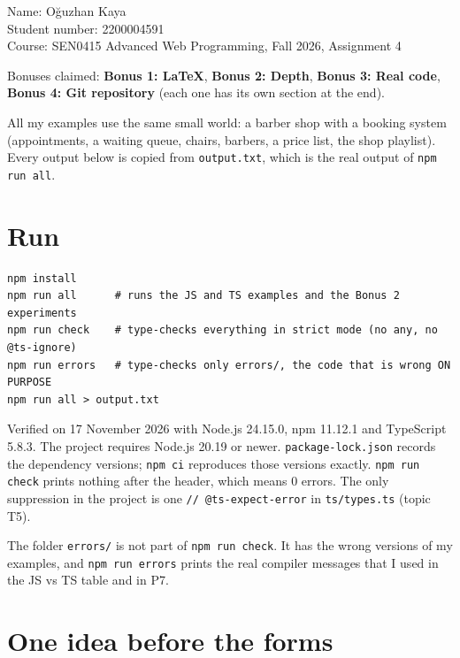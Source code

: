Name: Oğuzhan Kaya\\
Student number: 2200004591\\
Course: SEN0415 Advanced Web Programming, Fall 2026, Assignment 4

Bonuses claimed: \textbf{Bonus 1: LaTeX}, \textbf{Bonus 2: Depth}, \textbf{Bonus 3: Real code}, \textbf{Bonus 4: Git repository}
(each one has its own section at the end).

All my examples use the same small world: a barber shop with a booking system
(appointments, a waiting queue, chairs, barbers, a price list, the shop playlist).
Every output below is copied from \passthrough{\lstinline!output.txt!}, which is the real output of \passthrough{\lstinline!npm run all!}.

\section{Run}\label{run}

\begin{lstlisting}
npm install
npm run all      # runs the JS and TS examples and the Bonus 2 experiments
npm run check    # type-checks everything in strict mode (no any, no @ts-ignore)
npm run errors   # type-checks only errors/, the code that is wrong ON PURPOSE
npm run all > output.txt
\end{lstlisting}

Verified on 17 November 2026 with Node.js 24.15.0, npm 11.12.1 and TypeScript 5.8.3.
The project requires Node.js 20.19 or newer. \passthrough{\lstinline!package-lock.json!} records the dependency versions;
\passthrough{\lstinline!npm ci!} reproduces those versions exactly. \passthrough{\lstinline!npm run check!} prints nothing after the header, which means 0 errors.
The only suppression in the project is one \passthrough{\lstinline!// @ts-expect-error!} in \passthrough{\lstinline!ts/types.ts!} (topic T5).

The folder \passthrough{\lstinline!errors/!} is not part of \passthrough{\lstinline!npm run check!}. It has the wrong versions of my examples,
and \passthrough{\lstinline!npm run errors!} prints the real compiler messages that I used in the JS vs TS table and in P7.

\section{One idea before the forms}\label{one-idea-before-the-forms}

